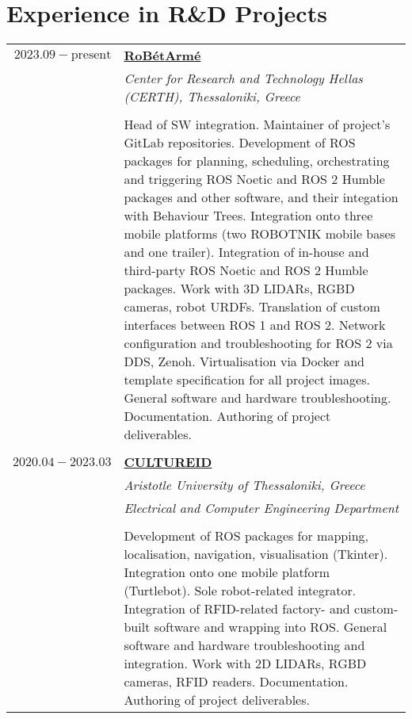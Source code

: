 \documentclass[a4paper,10pt,twoside]{article}
\begin{document}
\vspace*{\fill}
\newpage


\vspace*{\fill}
\section{Experience in R\&D Projects}

\begin{tabular}{rp{11cm}}
$2023.09 - \text{present}$ & \href{https://www.robetarme-project.eu/}{\textbf{RoBétArmé}} \\
                           & \textit{Center for Research and Technology Hellas (CERTH), Thessaloniki, Greece}\\
\\
                           & Head of SW integration. Maintainer of project's GitLab repositories. Development of ROS packages for planning, scheduling, orchestrating and triggering ROS Noetic and ROS 2 Humble packages and other software, and their integation with Behaviour Trees. Integration onto three mobile platforms (two ROBOTNIK mobile bases and one trailer). Integration of in-house and third-party ROS Noetic and ROS 2 Humble packages. Work with 3D LIDARs, RGBD cameras, robot URDFs. Translation of custom interfaces between ROS 1 and ROS 2. Network configuration and troubleshooting for ROS 2 via DDS, Zenoh. Virtualisation via Docker and template specification for all project images. General software and hardware troubleshooting. Documentation. Authoring of project deliverables. \\
&\\
$2020.04 - 2023.03$ & \href{https://cultureid.web.auth.gr/?page\_id=216\&lang=en}{\textbf{CULTUREID}} \\
                    & \textit{Aristotle University of Thessaloniki, Greece}\\
                    & \textit{Electrical and Computer Engineering Department} \\
\\
                    & Development of ROS packages for mapping, localisation, navigation, visualisation (Tkinter). Integration onto one mobile platform (Turtlebot). Sole robot-related integrator. Integration of RFID-related factory- and custom-built software and wrapping into ROS. General software and hardware troubleshooting and integration. Work with 2D LIDARs, RGBD cameras, RFID readers. Documentation. Authoring of project deliverables.\\

\end{tabular}
\end{document}
